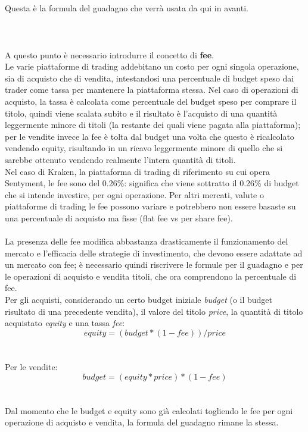 \documentclass{article}
\numberwithin{equation}{section}
\begin{document}
		\\~\\
		Questa è la formula del guadagno che verrà usata da qui in avanti.		
		\\~\\\\~\\
		A questo punto è necessario introdurre il concetto di \textbf{fee}.\\
		Le varie piattaforme di trading addebitano un costo per ogni singola operazione, sia di acquisto che di vendita, intestandosi una percentuale di budget speso dai trader come tassa per mantenere la piattaforma stessa. Nel caso di operazioni di acquisto, la tassa è calcolata come percentuale del budget speso per comprare il titolo, quindi viene scalata subito e il risultato è l'acquisto di una quantità leggermente minore di titoli (la restante dei quali viene pagata alla piattaforma); per le vendite invece la fee è tolta dal budget una volta che questo è ricalcolato vendendo equity, risultando in un ricavo leggermente minore di quello che si sarebbe ottenuto vendendo realmente l'intera quantità di titoli.\\
		Nel caso di Kraken, la piattaforma di trading di riferimento su cui opera Sentyment, le fee sono del 0.26\%: significa che viene sottratto il 0.26\% di budget che si intende investire, per ogni operazione. Per altri mercati, valute o piattaforme di trading le fee possono variare e potrebbero non essere basaste su una percentuale di acquisto ma fisse (flat fee vs per share fee).
		\\~\\
		La presenza delle fee modifica abbastanza drasticamente il funzionamento del mercato e l'efficacia delle strategie di investimento, che devono essere adattate ad un mercato con fee; è necessario quindi riscrivere le formule per il guadagno e per le operazioni di acquisto e vendita titoli, che ora comprendono la percentuale di fee.\\
		Per gli acquisti, considerando un certo budget iniziale \textit{budget} (o il budget risultato di una precedente vendita), il valore del titolo \textit{price}, la quantità di titolo acquistato \textit{equity} e una tassa \textit{fee}:\\
		\begin{equation}
			equity=(budget*(1-fee))/price
		\end{equation}
		\\~\\
		Per le vendite:\\
		\begin{equation}
			budget=(equity*price)*(1-fee)
		\end{equation}
		\\~\\
		Dal momento che le budget e equity sono già calcolati togliendo le fee per ogni operazione di acquisto e vendita, la formula del guadagno rimane la stessa.\\~\\
		
\end{document}
